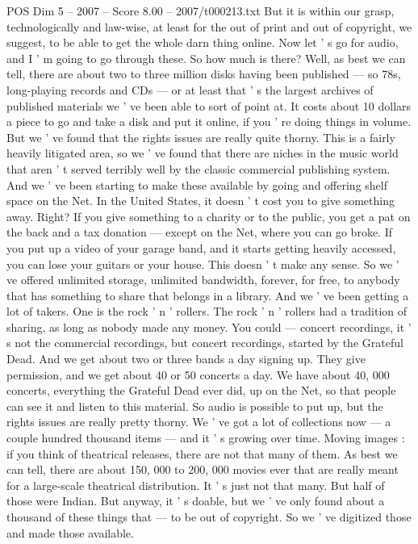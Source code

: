 \begin{textsample}{POS Dim 5 – 2007 – Score 8.00 – 2007/t000213.txt}
But it is within our grasp, technologically and law-wise, at least for the out of print and out of copyright, we suggest, to be able to get the whole darn thing online.
Now let ' s go for audio, and I ' m going to go through these.
So how much is there?
Well, as best we can tell, there are about two to three million disks having been published — so 78s, long-playing records and CDs — or at least that ' s the largest archives of published materials we ' ve been able to sort of point at.
It costs about 10 dollars a piece to go and take a disk and put it online, if you ' re doing things in volume.
But we ' ve found that the rights issues are really quite thorny.
This is a fairly heavily litigated area, so we ' ve found that there are niches in the music world that aren ' t served terribly well by the classic commercial publishing system.
And we ' ve been starting to make these available by going and offering shelf space on the Net.
In the United States, it doesn ' t cost you to give something away.
Right?
If you give something to a charity or to the public, you get a pat on the back and a tax donation — except on the Net, where you can go broke.
If you put up a video of your garage band, and it starts getting heavily accessed, you can lose your guitars or your house.
This doesn ' t make any sense.
So we ' ve offered unlimited storage, unlimited bandwidth, forever, for free, to anybody that has something to share that belongs in a library.
And we ' ve been getting a lot of takers.
One is the rock ' n ' rollers.
The rock ' n ' rollers had a tradition of sharing, as long as nobody made any money.
You could — concert recordings, it ' s not the commercial recordings, but concert recordings, started by the Grateful Dead.
And we get about two or three bands a day signing up.
They give permission, and we get about 40 or 50 concerts a day.
We have about 40, 000 concerts, everything the Grateful Dead ever did, up on the Net, so that people can see it and listen to this material.
So audio is possible to put up, but the rights issues are really pretty thorny.
We ' ve got a lot of collections now — a couple hundred thousand items — and it ' s growing over time.
Moving images : if you think of theatrical releases, there are not that many of them.
As best we can tell, there are about 150, 000 to 200, 000 movies ever that are really meant for a large-scale theatrical distribution.
It ' s just not that many.
But half of those were Indian.
But anyway, it ' s doable, but we ' ve only found about a thousand of these things that — to be out of copyright.
So we ' ve digitized those and made those available.

\end{textsample}
